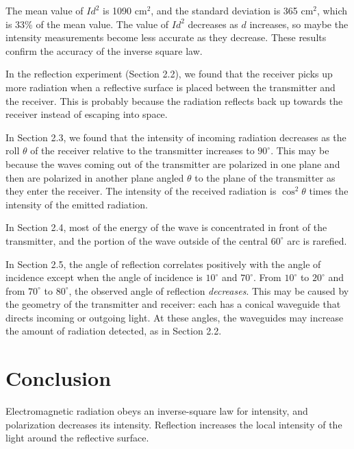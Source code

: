\documentclass[11pt, titlepage, letterpaper, twoside]{article}
\begin{document}
The mean value of $Id^2$ is 1090 cm$^2$, and the standard deviation is 365 cm$^2$, which is
33\% of the mean value. The value of $Id^2$ decreases as $d$ increases, so maybe the intensity
measurements become less accurate as they decrease. These results confirm the accuracy of
the inverse square law.

In the reflection experiment (Section 2.2), we found that the receiver picks up more radiation when a
reflective surface is placed between the transmitter and the receiver. This is probably because the
radiation reflects back up towards the receiver instead of escaping into space.

In Section 2.3, we found that the intensity of incoming radiation decreases as the roll $\theta$ of the
receiver relative to the transmitter increases to $90^\circ$. This may be because the waves coming out
of the transmitter are polarized in one plane and then are polarized in another plane angled $\theta$
to the plane of the transmitter as they enter the receiver. The intensity of the received radiation is
$\cos^2 \theta$ times the intensity of the emitted radiation.

In Section 2.4, most of the energy of the wave is concentrated in front of the transmitter, and the
portion of the wave outside of the central $60^\circ$ arc is rarefied.

In Section 2.5, the angle of reflection correlates positively with the angle of incidence except when
the angle of incidence is $10^\circ$ and $70^\circ$. From $10^\circ$ to $20^\circ$ and from $70^\circ$
to $80^\circ$, the observed angle of reflection \textit{decreases}. This may be caused by the geometry
of the transmitter and receiver: each has a conical waveguide that directs incoming or outgoing light.
At these angles, the waveguides may increase the amount of radiation detected, as in Section 2.2.

\section{Conclusion}

Electromagnetic radiation obeys an inverse-square law for intensity, and polarization decreases its intensity.
Reflection increases the local intensity of the light around the reflective surface.
\end{document}
